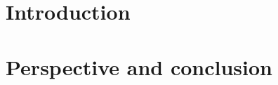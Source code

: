 \documentclass[9pt]{beamer}
\author{\textsc{Abel Douzal} \\
 \textsc{Ruben Ifrah} \\
 \textsc{Pierre Cornilleau}}
\date{28 février 2025}
\begin{document}
\frame{\titlepage}
\frame{\tableofcontents}



\section{Introduction}




\section{Perspective and conclusion}
\end{document}
